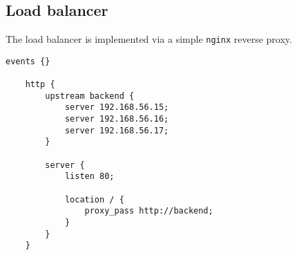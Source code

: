 \documentclass[../documentation.tex]{subfiles}
\begin{document}
\pagebreak

\subsection{Load balancer}

The load balancer is implemented via a simple
\texttt{nginx}\cite{nginx} reverse proxy.

\begin{lstlisting}[language=Nginx]
    events {}

    http {
        upstream backend {
            server 192.168.56.15;
            server 192.168.56.16;
            server 192.168.56.17;
        }
            
        server {
            listen 80;
    
            location / {
                proxy_pass http://backend;
            }
        }
    }
\end{lstlisting}
\end{document}
